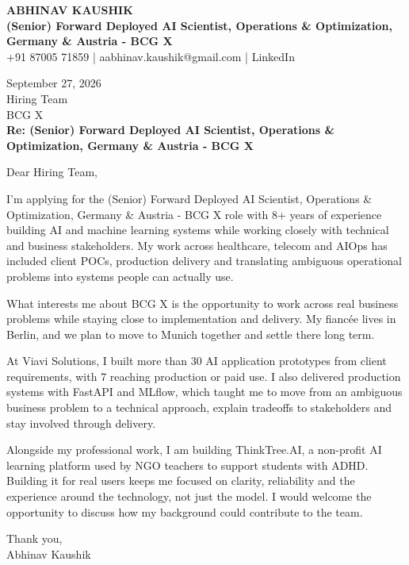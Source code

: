 \documentclass[10pt,a4paper]{article}
\begin{document}
\begin{center}
{\Large\bfseries ABHINAV KAUSHIK}\\[2pt]
{\bfseries (Senior) Forward Deployed AI Scientist, Operations \& Optimization, Germany \& Austria - BCG X}\\[2pt]
+91 87005 71859 \quad | \quad aabhinav.kaushik@gmail.com \quad | \quad LinkedIn
\end{center}
\vspace{8pt}
September 27, 2026\\[6pt]
Hiring Team\\
BCG X\\[4pt]
\textbf{Re: (Senior) Forward Deployed AI Scientist, Operations \& Optimization, Germany \& Austria - BCG X}

Dear Hiring Team,

I’m applying for the (Senior) Forward Deployed AI Scientist, Operations \& Optimization, Germany \& Austria - BCG X role with 8+ years of experience building AI and machine learning systems while working closely with technical and business stakeholders. My work across healthcare, telecom and AIOps has included client POCs, production delivery and translating ambiguous operational problems into systems people can actually use.

What interests me about BCG X is the opportunity to work across real business problems while staying close to implementation and delivery. My fiancée lives in Berlin, and we plan to move to Munich together and settle there long term.

At Viavi Solutions, I built more than 30 AI application prototypes from client requirements, with 7 reaching production or paid use. I also delivered production systems with FastAPI and MLflow, which taught me to move from an ambiguous business problem to a technical approach, explain tradeoffs to stakeholders and stay involved through delivery.

Alongside my professional work, I am building ThinkTree.AI, a non-profit AI learning platform used by NGO teachers to support students with ADHD. Building it for real users keeps me focused on clarity, reliability and the experience around the technology, not just the model. I would welcome the opportunity to discuss how my background could contribute to the team.

Thank you,\\
Abhinav Kaushik
\end{document}
